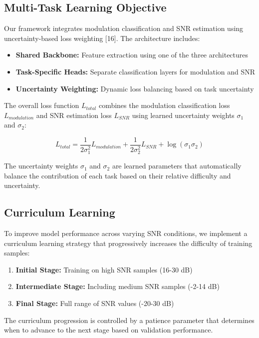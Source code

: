 \documentclass{ELSP}
\begin{document}
\subsection{Multi-Task Learning Objective}
Our framework integrates modulation classification and SNR estimation using uncertainty-based loss weighting [16]. The architecture includes:

\begin{itemize}
    \item \textbf{Shared Backbone:} Feature extraction using one of the three architectures
    \item \textbf{Task-Specific Heads:} Separate classification layers for modulation and SNR
    \item \textbf{Uncertainty Weighting:} Dynamic loss balancing based on task uncertainty
\end{itemize}

The overall loss function $L_{total}$ combines the modulation classification loss $L_{modulation}$ and SNR estimation loss $L_{SNR}$ using learned uncertainty weights $\sigma_1$ and $\sigma_2$:

\begin{equation}
    L_{total} = \frac{1}{2\sigma_1^2}L_{modulation} + \frac{1}{2\sigma_2^2}L_{SNR} + \log(\sigma_1\sigma_2)
\end{equation}

The uncertainty weights $\sigma_1$ and $\sigma_2$ are learned parameters that automatically balance the contribution of each task based on their relative difficulty and uncertainty.

\subsection{Curriculum Learning}
To improve model performance across varying SNR conditions, we implement a curriculum learning strategy that progressively increases the difficulty of training samples:

\begin{enumerate}[(1)]
    \item \textbf{Initial Stage:} Training on high SNR samples (16-30 dB)
    \item \textbf{Intermediate Stage:} Including medium SNR samples (-2-14 dB)
    \item \textbf{Final Stage:} Full range of SNR values (-20-30 dB)
\end{enumerate}

The curriculum progression is controlled by a patience parameter that determines when to advance to the next stage based on validation performance.
\end{document}

